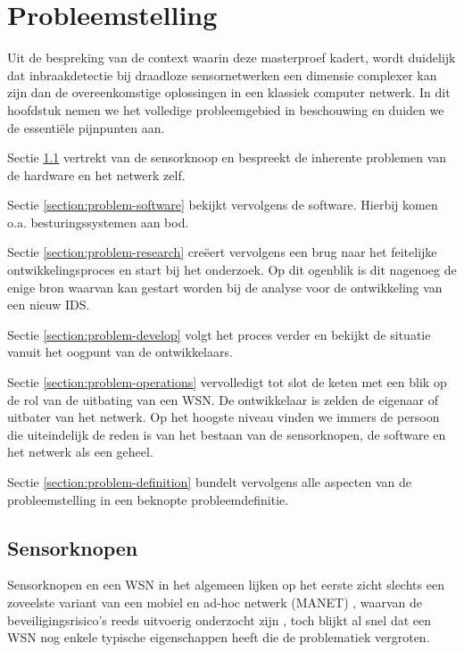
\chapter{Probleemstelling}
\label{chapter:probleemstelling}

Uit de bespreking van de context waarin deze masterproef kadert, wordt
duidelijk dat inbraakdetectie bij draadloze sensornetwerken een dimensie
complexer kan zijn dan de overeenkomstige oplossingen in een klassiek computer
netwerk. In dit hoofdstuk nemen we het volledige probleemgebied in beschouwing
en duiden we de essenti\"ele pijnpunten aan.

Sectie \ref{section:problem-hardware} vertrekt van de sensorknoop en bespreekt
de inherente problemen van de hardware en het netwerk zelf.

Sectie \ref{section:problem-software} bekijkt vervolgens de software. Hierbij
komen o.a. besturingssystemen aan bod.

Sectie \ref{section:problem-research} cre\"eert vervolgens een brug naar het
feitelijke ontwikkelingsproces en start bij het onderzoek. Op dit ogenblik is
dit nagenoeg de enige bron waarvan kan gestart worden bij de analyse voor de
ontwikkeling van een nieuw IDS.

Sectie \ref{section:problem-develop} volgt het proces verder en bekijkt de
situatie vanuit het oogpunt van de ontwikkelaars.

Sectie \ref{section:problem-operations} vervolledigt tot slot de keten met een
blik op de rol van de uitbating van een WSN. De ontwikkelaar is zelden de
eigenaar of uitbater van het netwerk. Op het hoogste niveau vinden we immers de
persoon die uiteindelijk de reden is van het bestaan van de sensorknopen, de
software en het netwerk als een geheel.

Sectie \ref{section:problem-definition} bundelt vervolgens alle aspecten van de
probleemstelling in een beknopte probleemdefinitie.

\section{Sensorknopen}
\label{section:problem-hardware}

Sensorknopen en een WSN in het algemeen lijken op het eerste zicht slechts een
zoveelste variant van een mobiel en ad-hoc netwerk (MANET)
\citep{garg2010mobile}, waarvan de beveiligingsrisico's reeds uitvoerig
onderzocht zijn \citep{djenouri2005survey, zhang2000intrusion,
kachirski2003effective}, toch blijkt al snel dat een WSN nog enkele typische
eigenschappen heeft die de problematiek vergroten.

